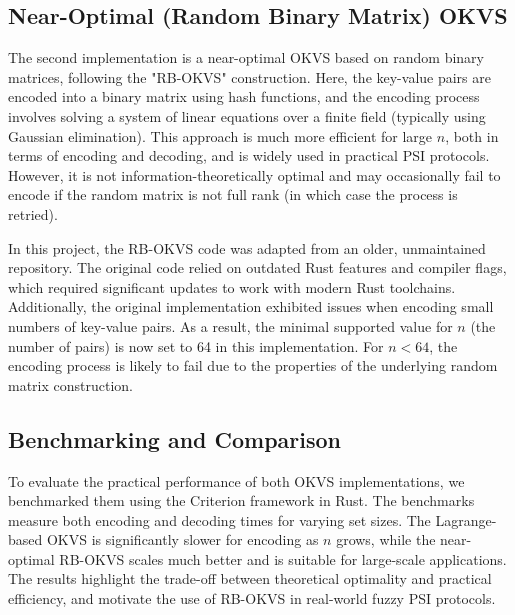 \subsection{Near-Optimal (Random Binary Matrix) OKVS}
The second implementation is a near-optimal OKVS based on random binary matrices, following the "RB-OKVS" construction. Here, the key-value pairs are encoded into a binary matrix using hash functions, and the encoding process involves solving a system of linear equations over a finite field (typically using Gaussian elimination). This approach is much more efficient for large $n$, both in terms of encoding and decoding, and is widely used in practical PSI protocols. However, it is not information-theoretically optimal and may occasionally fail to encode if the random matrix is not full rank (in which case the process is retried).

In this project, the RB-OKVS code was adapted from an older, unmaintained repository. The original code relied on outdated Rust features and compiler flags, which required significant updates to work with modern Rust toolchains. Additionally, the original implementation exhibited issues when encoding small numbers of key-value pairs. As a result, the minimal supported value for $n$ (the number of pairs) is now set to 64 in this implementation. For $n < 64$, the encoding process is likely to fail due to the properties of the underlying random matrix construction.

\subsection{Benchmarking and Comparison}
To evaluate the practical performance of both OKVS implementations, we benchmarked them using the Criterion framework in Rust. The benchmarks measure both encoding and decoding times for varying set sizes. The Lagrange-based OKVS is significantly slower for encoding as $n$ grows, while the near-optimal RB-OKVS scales much better and is suitable for large-scale applications. The results highlight the trade-off between theoretical optimality and practical efficiency, and motivate the use of RB-OKVS in real-world fuzzy PSI protocols.

